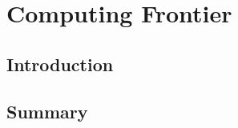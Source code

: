  
\chapter{Computing Frontier}
\label{chap:Computing}


\begin{center}\begin{boldmath}



\end{boldmath}\end{center}


\section{Introduction}
\label{sec:comp-intro}


\section{Summary}
\label{sec:comp-summary}






